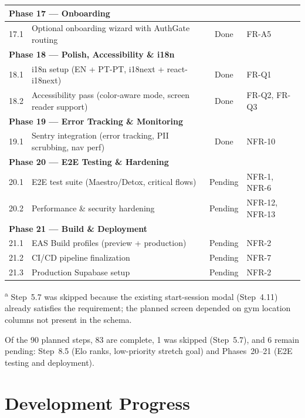 \documentclass[12pt,a4paper]{report}
\renewcommand\_{\textunderscore\hspace{0pt}}
\begin{document}
\begin{longtable}{l >{\raggedright\arraybackslash}p{7.5cm} c >{\raggedright\arraybackslash}p{3cm}}
\hline
\multicolumn{4}{l}{\textbf{Phase 17 --- Onboarding}} \\
\hline
17.1 & Optional onboarding wizard with AuthGate routing & Done & FR-A5 \\

\hline
\multicolumn{4}{l}{\textbf{Phase 18 --- Polish, Accessibility \& i18n}} \\
\hline
18.1 & i18n setup (EN + PT-PT, i18next + react-i18next) & Done & FR-Q1 \\
18.2 & Accessibility pass (color-aware mode, screen reader support) & Done & FR-Q2, FR-Q3 \\

\hline
\multicolumn{4}{l}{\textbf{Phase 19 --- Error Tracking \& Monitoring}} \\
\hline
19.1 & Sentry integration (error tracking, PII scrubbing, nav perf) & Done & NFR-10 \\

\hline
\multicolumn{4}{l}{\textbf{Phase 20 --- E2E Testing \& Hardening}} \\
\hline
20.1 & E2E test suite (Maestro/Detox, critical flows) & Pending & NFR-1, NFR-6 \\
20.2 & Performance \& security hardening & Pending & NFR-12, NFR-13 \\

\hline
\multicolumn{4}{l}{\textbf{Phase 21 --- Build \& Deployment}} \\
\hline
21.1 & EAS Build profiles (preview + production) & Pending & NFR-2 \\
21.2 & CI/CD pipeline finalization & Pending & NFR-7 \\
21.3 & Production Supabase setup & Pending & NFR-2 \\

\hline
\end{longtable}
\normalsize

\noindent\textsuperscript{a} Step~5.7 was skipped because the existing start-session modal (Step~4.11) already satisfies the requirement; the planned screen depended on gym location columns not present in the schema.

\vspace{0.3cm}

Of the 90 planned steps, 83 are complete, 1 was skipped (Step~5.7), and 6 remain pending: Step~8.5 (Elo ranks, low-priority stretch goal) and Phases~20--21 (E2E testing and deployment).

\section{Development Progress}
\end{document}
